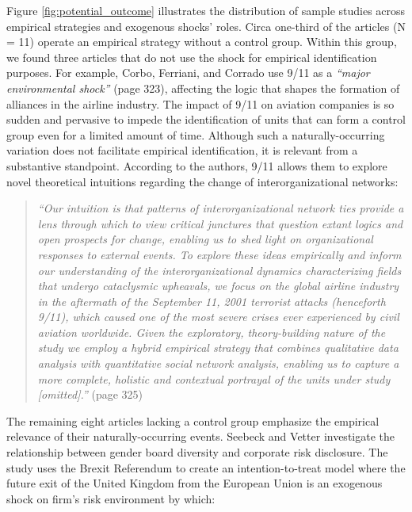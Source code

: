 \documentclass[11pt]{article}
\begin{document}
\begin{refsection}
Figure \ref{fig:potential_outcome} illustrates the distribution of sample
studies across empirical strategies and exogenous shocks' roles. Circa one-third of 
the articles (N = 11) operate an empirical strategy without a control group. Within 
this group, we found three articles that do not use the shock for empirical 
identification purposes. For example, Corbo, Ferriani, and Corrado
\autocite*{corbo2016323} use 9/11 as a \textit{``major environmental shock''}
(page 323), affecting the logic that shapes the formation of alliances in the
airline industry. The impact of 9/11 on aviation companies is so sudden and
pervasive to impede the identification of units that can form a control group
even for a limited amount of time.  Although such a naturally-occurring
variation does not facilitate empirical identification, it is relevant from a
substantive standpoint. According to the authors, 9/11 allows them to explore
novel theoretical intuitions regarding the change of interorganizational
networks:

\begin{quote}
  \textit{
    ``Our intuition is that patterns of interorganizational network ties provide
    a lens through which to view critical junctures that question extant logics
    and open prospects for change, enabling us to shed light on organizational
    responses to external events.  To explore these ideas empirically and inform
    our understanding of the interorganizational dynamics characterizing fields
    that undergo cataclysmic upheavals, we focus on the global airline industry
    in the aftermath of the September 11, 2001 terrorist attacks (henceforth
    9/11), which caused one of the most severe crises ever experienced by civil
    aviation worldwide. Given the exploratory, theory-building nature of the
    study we employ a hybrid empirical strategy that combines qualitative data
    analysis with quantitative social network analysis, enabling us to capture a
    more complete, holistic and contextual portrayal of the units under study
    [omitted].''
  }
  (page 325)
\end{quote}

The remaining eight articles lacking a control group emphasize the empirical
relevance of their naturally-occurring events. Seebeck and Vetter
\autocite*{seebeck2021} investigate the relationship between gender board
diversity and corporate risk disclosure.  The study uses the Brexit Referendum
to create an intention-to-treat model where the future exit of the United
Kingdom from the European Union is an exogenous shock on firm's risk environment
by which:


\end{refsection}
\end{document}
